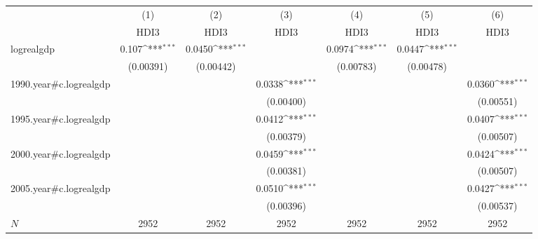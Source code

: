 {
\def\sym#1{\ifmmode^{#1}\else\(^{#1}\)\fi}
\begin{tabular}{l*{6}{c}}
\hline\hline
            &\multicolumn{1}{c}{(1)}&\multicolumn{1}{c}{(2)}&\multicolumn{1}{c}{(3)}&\multicolumn{1}{c}{(4)}&\multicolumn{1}{c}{(5)}&\multicolumn{1}{c}{(6)}\\
            &\multicolumn{1}{c}{HDI3}&\multicolumn{1}{c}{HDI3}&\multicolumn{1}{c}{HDI3}&\multicolumn{1}{c}{HDI3}&\multicolumn{1}{c}{HDI3}&\multicolumn{1}{c}{HDI3}\\
\hline
logrealgdp  &       0.107\sym{***}&      0.0450\sym{***}&                     &      0.0974\sym{***}&      0.0447\sym{***}&                     \\
            &   (0.00391)         &   (0.00442)         &                     &   (0.00783)         &   (0.00478)         &                     \\
[1em]
1990.year#c.logrealgdp&                     &                     &      0.0338\sym{***}&                     &                     &      0.0360\sym{***}\\
            &                     &                     &   (0.00400)         &                     &                     &   (0.00551)         \\
[1em]
1995.year#c.logrealgdp&                     &                     &      0.0412\sym{***}&                     &                     &      0.0407\sym{***}\\
            &                     &                     &   (0.00379)         &                     &                     &   (0.00507)         \\
[1em]
2000.year#c.logrealgdp&                     &                     &      0.0459\sym{***}&                     &                     &      0.0424\sym{***}\\
            &                     &                     &   (0.00381)         &                     &                     &   (0.00507)         \\
[1em]
2005.year#c.logrealgdp&                     &                     &      0.0510\sym{***}&                     &                     &      0.0427\sym{***}\\
            &                     &                     &   (0.00396)         &                     &                     &   (0.00537)         \\
\hline
\(N\)       &        2952         &        2952         &        2952         &        2952         &        2952         &        2952         \\

\end{tabular}}
